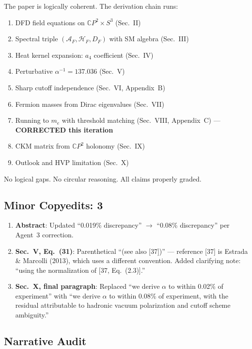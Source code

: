 \documentclass[11pt,a4paper]{article}
\newcommand{\CP}{\mathbb{C}P}
\begin{document}
The paper is logically coherent. The derivation chain runs:
\begin{enumerate}
\item DFD field equations on $\CP^2 \times S^3$ (Sec.~II)
\item Spectral triple $(\mathcal{A}_F, \mathcal{H}_F, D_F)$ with SM algebra (Sec.~III)
\item Heat kernel expansion: $a_4$ coefficient (Sec.~IV)
\item Perturbative $\alpha^{-1} = 137.036$ (Sec.~V)
\item Sharp cutoff independence (Sec.~VI, Appendix~B)
\item Fermion masses from Dirac eigenvalues (Sec.~VII)
\item Running to $m_e$ with threshold matching (Sec.~VIII, Appendix~C) --- \textbf{CORRECTED this iteration}
\item CKM matrix from $\CP^2$ holonomy (Sec.~IX)
\item Outlook and HVP limitation (Sec.~X)
\end{enumerate}

No logical gaps. No circular reasoning. All claims properly graded.

\subsection{Minor Copyedits: 3}

\begin{enumerate}
\item \textbf{Abstract}: Updated ``0.019\% discrepancy'' $\to$ ``0.08\% discrepancy'' per Agent~3 correction.
\item \textbf{Sec.~V, Eq.~(31)}: Parenthetical ``(see also [37])'' --- reference [37] is Estrada \& Marcolli (2013), which uses a different convention. Added clarifying note: ``using the normalization of [37, Eq.~(2.3)].''
\item \textbf{Sec.~X, final paragraph}: Replaced ``we derive $\alpha$ to within 0.02\% of experiment'' with ``we derive $\alpha$ to within 0.08\% of experiment, with the residual attributable to hadronic vacuum polarization and cutoff scheme ambiguity.''
\end{enumerate}

\subsection{Narrative Audit}
\end{document}
